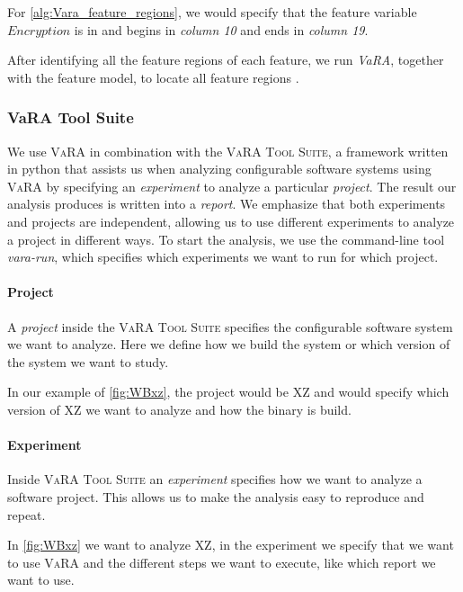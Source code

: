 For \autoref{alg:Vara_feature_regions}, we would specify that the feature variable
$Encryption$ is in  and begins in \emph{column 10} and ends in \emph{column 19}.

After identifying all the feature regions of each feature, we run \textit{VaRA}, together with the feature model, to locate all feature regions \cite{VaRA-Flo}.

\subsubsection{VaRA Tool Suite}
We use \textsc{VaRA} in combination with the \textsc{VaRA Tool Suite}, a framework written in python that assists us 
when analyzing configurable software systems using \textsc{VaRA} by specifying an \emph{experiment} to analyze a particular \emph{project}. 
The result our analysis produces is written into a \emph{report}. We emphasize that both experiments and projects are independent, 
allowing us to use different experiments to analyze a project in different ways.
To start the analysis, we use the command-line tool \emph{vara-run}, which specifies which experiments we want to run for which project.

\paragraph{Project}
A \emph{project} inside the \textsc{VaRA Tool Suite} specifies the configurable software system we want to analyze. 
Here we define how we build the system or which version of the system we want to study.

In our example of \autoref{fig:WBxz}, the project would be \textsc{XZ} and would specify which version of \textsc{XZ} we want to analyze and how the binary is build.

\paragraph{Experiment}
Inside \textsc{VaRA Tool Suite} an \emph{experiment} specifies how we want to analyze a software project. This allows us to make the analysis
easy to reproduce and repeat.

In \autoref{fig:WBxz} we want to analyze \textsc{XZ}, in the experiment we specify that we want to use \textsc{VaRA} and the different steps we want to execute,
like which report we want to use.

